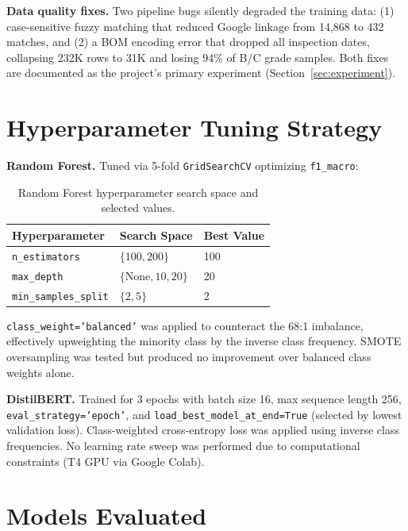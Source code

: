 \documentclass{article}
\begin{document}
\textbf{Data quality fixes.} Two pipeline bugs silently degraded the training data: (1) case-sensitive fuzzy matching that reduced Google linkage from 14,868 to 432 matches, and (2) a BOM encoding error that dropped all inspection dates, collapsing 232K rows to 31K and losing 94\% of B/C grade samples. Both fixes are documented as the project's primary experiment (Section~\ref{sec:experiment}).

\section{Hyperparameter Tuning Strategy}

\textbf{Random Forest.} Tuned via 5-fold \texttt{GridSearchCV} optimizing \texttt{f1\_macro}:

\begin{table}[h]
\centering
\caption{Random Forest hyperparameter search space and selected values.}
\label{tab:hyperparams}
\begin{tabular}{lll}
\toprule
\textbf{Hyperparameter} & \textbf{Search Space} & \textbf{Best Value} \\
\midrule
\texttt{n\_estimators} & $\{100, 200\}$ & 100 \\
\texttt{max\_depth} & $\{\text{None}, 10, 20\}$ & 20 \\
\texttt{min\_samples\_split} & $\{2, 5\}$ & 2 \\
\bottomrule
\end{tabular}
\end{table}

\texttt{class\_weight='balanced'} was applied to counteract the 68:1 imbalance, effectively upweighting the minority class by the inverse class frequency. SMOTE oversampling was tested but produced no improvement over balanced class weights alone.

\textbf{DistilBERT.} Trained for 3 epochs with batch size 16, max sequence length 256, \texttt{eval\_strategy='epoch'}, and \texttt{load\_best\_model\_at\_end=True} (selected by lowest validation loss). Class-weighted cross-entropy loss was applied using inverse class frequencies. No learning rate sweep was performed due to computational constraints (T4 GPU via Google Colab).

\section{Models Evaluated}
\end{document}
